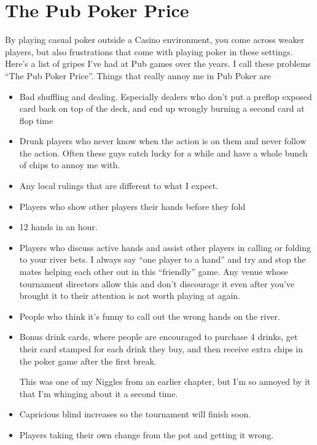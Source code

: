 \chapter{The Pub Poker Price}


By playing casual poker outside a Casino environment, you come across
weaker players, but also frustrations that come with playing
poker in these settings. Here's a list of gripes I've had at Pub
games over the years. I call these problems ``The Pub Poker Price''.
Things that really annoy me in Pub Poker are

\begin{itemize}

\item Bad shuffling and dealing. Especially dealers who don't
put a preflop exposed card back on top of the deck, and end
up wrongly burning a second card at flop time

\item Drunk players who never know when the action is on them and
never follow the action. Often these guys catch lucky for a while
and have a whole bunch of chips to annoy me with.

\item Any local rulings that are different to what I expect.

\item Players who show other players their hands before they fold

\item 12 hands in an hour.

\item Players who discuss active hands and assist other players in
calling or folding to your river bets. I always say ``one
player to a hand'' and try and stop the mates helping each other
out in this ``friendly'' game. Any venue whose tournament directors
allow this and don't discourage it even after you've brought
it to their attention is not worth playing at again.

\item People who think it's funny to call out the wrong hands on the river.

\item Bonus drink cards, where people are encouraged to purchase 4 drinks,
get their card stamped for each drink they buy, and then receive extra
chips in the poker game after the first break.

This was one of my Niggles from an earlier chapter, but I'm so annoyed
by it that I'm whinging about it a second time.

\item Capricious blind increases so the tournament will finish soon.

\item Players taking their own change from the pot and getting it wrong.

\end{itemize}

